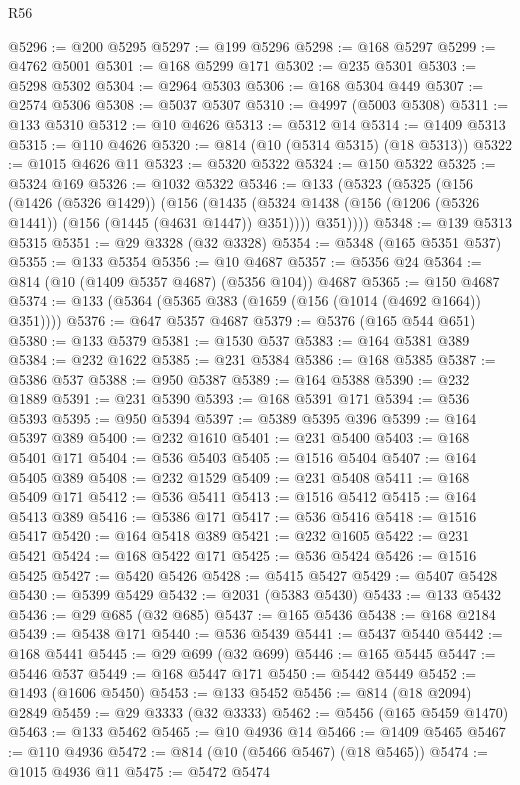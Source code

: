 \begin{lexlean}{R56}
\begin{coremodule}
{{{{{{{{{{{{{{{{{{{{{{{{{{{{{{{{{{{{{{{{{{{{{{{{{{{{{{{{{{{{{{{{{{{{{{{{{{{{{{{{{{{{{{{{{{{{{{{{{{{{{{{{{{{{{{{{{{{{{{{{{{{{{{{{{{{{{{{{{{{{{{{{{{{{{{{{{{{{{{{{{{{{{{{{{{{{{{{{{{{{{{{{{{{{{{{{{{{{{{{{{{{{{{{{{{{@5296 := @200 @5295
@5297 := @199 @5296
@5298 := @168 @5297
@5299 := @4762 @5001
@5301 := @168 @5299 @171
@5302 := @235 @5301
@5303 := @5298 @5302
@5304 := @2964 @5303
@5306 := @168 @5304 @449
@5307 := @2574 @5306
@5308 := @5037 @5307
@5310 := @4997 (@5003 @5308)
@5311 := @133 @5310
@5312 := @10 @4626
@5313 := @5312 @14
@5314 := @1409 @5313
@5315 := @110 @4626
@5320 := @814 (@10 (@5314 @5315) (@18 @5313))
@5322 := @1015 @4626 @11
@5323 := @5320 @5322
@5324 := @150 @5322
@5325 := @5324 @169
@5326 := @1032 @5322
@5346 := @133
    (@5323
      (@5325
        (@156
          (@1426 (@5326 @1429))
          (@156
            (@1435 (@5324 @1438 (@156 (@1206 (@5326 @1441)) (@156 (@1445 (@4631 @1447)) @351))))
            @351))))
@5348 := @139 @5313 @5315
@5351 := @29 @3328 (@32 @3328)
@5354 := @5348 (@165 @5351 @537)
@5355 := @133 @5354
@5356 := @10 @4687
@5357 := @5356 @24
@5364 := @814 (@10 (@1409 @5357 @4687) (@5356 @104)) @4687
@5365 := @150 @4687
@5374 := @133 (@5364 (@5365 @383 (@1659 (@156 (@1014 (@4692 @1664)) @351))))
@5376 := @647 @5357 @4687
@5379 := @5376 (@165 @544 @651)
@5380 := @133 @5379
@5381 := @1530 @537
@5383 := @164 @5381 @389
@5384 := @232 @1622
@5385 := @231 @5384
@5386 := @168 @5385
@5387 := @5386 @537
@5388 := @950 @5387
@5389 := @164 @5388
@5390 := @232 @1889
@5391 := @231 @5390
@5393 := @168 @5391 @171
@5394 := @536 @5393
@5395 := @950 @5394
@5397 := @5389 @5395 @396
@5399 := @164 @5397 @389
@5400 := @232 @1610
@5401 := @231 @5400
@5403 := @168 @5401 @171
@5404 := @536 @5403
@5405 := @1516 @5404
@5407 := @164 @5405 @389
@5408 := @232 @1529
@5409 := @231 @5408
@5411 := @168 @5409 @171
@5412 := @536 @5411
@5413 := @1516 @5412
@5415 := @164 @5413 @389
@5416 := @5386 @171
@5417 := @536 @5416
@5418 := @1516 @5417
@5420 := @164 @5418 @389
@5421 := @232 @1605
@5422 := @231 @5421
@5424 := @168 @5422 @171
@5425 := @536 @5424
@5426 := @1516 @5425
@5427 := @5420 @5426
@5428 := @5415 @5427
@5429 := @5407 @5428
@5430 := @5399 @5429
@5432 := @2031 (@5383 @5430)
@5433 := @133 @5432
@5436 := @29 @685 (@32 @685)
@5437 := @165 @5436
@5438 := @168 @2184
@5439 := @5438 @171
@5440 := @536 @5439
@5441 := @5437 @5440
@5442 := @168 @5441
@5445 := @29 @699 (@32 @699)
@5446 := @165 @5445
@5447 := @5446 @537
@5449 := @168 @5447 @171
@5450 := @5442 @5449
@5452 := @1493 (@1606 @5450)
@5453 := @133 @5452
@5456 := @814 (@18 @2094) @2849
@5459 := @29 @3333 (@32 @3333)
@5462 := @5456 (@165 @5459 @1470)
@5463 := @133 @5462
@5465 := @10 @4936 @14
@5466 := @1409 @5465
@5467 := @110 @4936
@5472 := @814 (@10 (@5466 @5467) (@18 @5465))
@5474 := @1015 @4936 @11
@5475 := @5472 @5474
}}}}}}}}}}}}}}}}}}}}}}}}}}}}}}}}}}}}}}}}}}}}}}}}}}}}}}}}}}}}}}}}}}}}}}}}}}}}}}}}}}}}}}}}}}}}}}}}}}}}}}}}}}}}}}}}}}}}}}}}}}}}}}}}}}}}}}}}}}}}}}}}}}}}}}}}}}}}}}}}}}}}}}}}}}}}}}}}}}}}}}}}}}}}}}}}}}}}}}}}}}}}}}}}}}}
\end{coremodule}
\end{lexlean}
